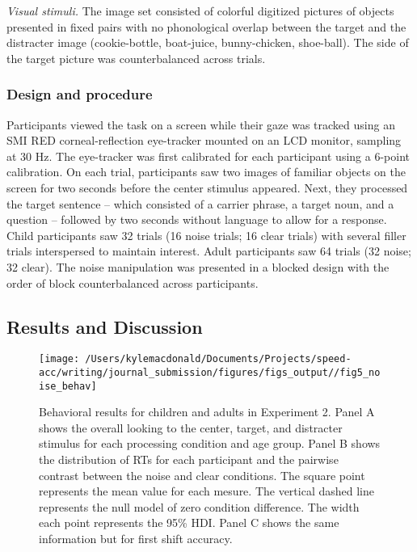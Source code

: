 \documentclass[,man,floatsintext]{apa6}
\begin{document}
\emph{Visual stimuli.} The image set consisted of colorful digitized
pictures of objects presented in fixed pairs with no phonological
overlap between the target and the distracter image (cookie-bottle,
boat-juice, bunny-chicken, shoe-ball). The side of the target picture
was counterbalanced across trials.

\subsubsection{Design and procedure}\label{design-and-procedure-1}

Participants viewed the task on a screen while their gaze was tracked
using an SMI RED corneal-reflection eye-tracker mounted on an LCD
monitor, sampling at 30 Hz. The eye-tracker was first calibrated for
each participant using a 6-point calibration. On each trial,
participants saw two images of familiar objects on the screen for two
seconds before the center stimulus appeared. Next, they processed the
target sentence -- which consisted of a carrier phrase, a target noun,
and a question -- followed by two seconds without language to allow for
a response. Child participants saw 32 trials (16 noise trials; 16 clear
trials) with several filler trials interspersed to maintain interest.
Adult participants saw 64 trials (32 noise; 32 clear). The noise
manipulation was presented in a blocked design with the order of block
counterbalanced across participants.

\subsection{Results and Discussion}\label{results-and-discussion}

\begin{figure}[!t]

{\centering \texttt{[image: /Users/kylemacdonald/Documents/Projects/speed-acc/writing/journal\_submission/figures/figs\_output//fig5\_noise\_behav]} 

}

\caption{Behavioral results for children and adults in Experiment 2. Panel A shows the overall looking to the center, target, and distracter stimulus for each processing condition and age group. Panel B shows the distribution of RTs for each participant and the pairwise contrast between the noise and clear conditions. The square point represents the mean value for each mesure. The vertical dashed line represents the null model of zero condition difference. The width each point represents the 95\% HDI. Panel C shows the same information but for first shift accuracy.}\label{fig:noise-acc-rt-plot}
\end{figure}
\end{document}
